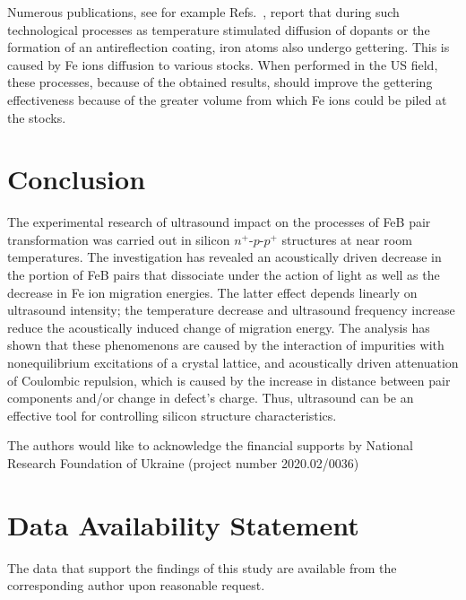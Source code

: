 \documentclass[%
 aip,jap,
 amsmath,amssymb,
 reprint,%
]{revtex4-1}
\begin{document}
Numerous publications, see for example Refs.~, report that during such technological processes as temperature stimulated diffusion of dopants or the formation of an antireflection coating,
iron atoms also undergo gettering.
This is caused by Fe ions diffusion to various stocks.
When performed in the US field, these processes, because of the obtained results,
should  improve the gettering effectiveness because of the greater volume from which
Fe ions could be piled at the stocks.

\section{Conclusion}
The experimental research of ultrasound impact on the processes of FeB pair transformation was carried out in silicon $n^+$-$p$-$p^+$ structures at near room temperatures.
The investigation has revealed an acoustically driven decrease in the portion of FeB pairs that dissociate under the action of light as well as the decrease in Fe ion migration energies.
The latter effect depends linearly on ultrasound intensity;
the temperature decrease and ultrasound frequency increase reduce the acoustically induced change of migration energy.
The analysis has shown that these phenomenons are caused by the interaction of impurities with nonequilibrium excitations of a crystal lattice,  and acoustically driven attenuation of Coulombic repulsion, which is caused by the increase in distance between pair components and/or change in defect's charge.
Thus, ultrasound can be an effective  tool for controlling silicon structure characteristics.



\begin{acknowledgments}
The authors would like to acknowledge the financial supports by National Research Foundation  of Ukraine
(project number 2020.02/0036)
\end{acknowledgments}

\section*{Data Availability Statement}

The data that support the findings of this study are available from the corresponding author upon reasonable request.
\end{document}
